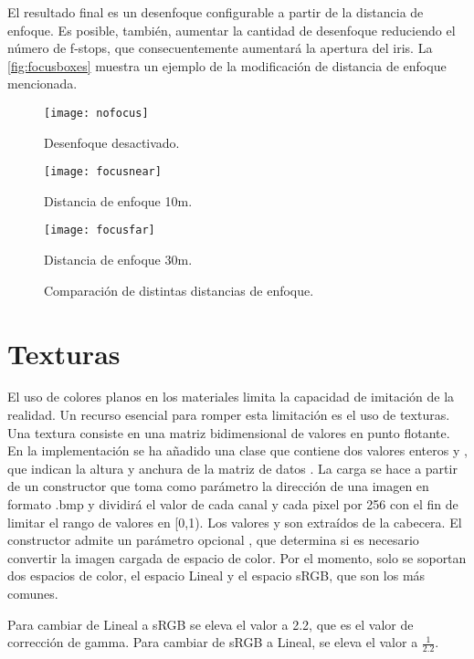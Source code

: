 El resultado final es un desenfoque configurable a partir de la distancia de enfoque. Es posible, también, aumentar la cantidad de desenfoque reduciendo el número de f-stops, que consecuentemente aumentará la apertura del iris. La \autoref{fig:focusboxes} muestra un ejemplo de la modificación de distancia de enfoque mencionada.

\begin{figure}[H]
	\centering
  \begin{minipage}[b]{0.3\textwidth}
	\texttt{[image: nofocus]}
	\caption{Desenfoque desactivado.}
  \end{minipage}
  \hfill
  \begin{minipage}[b]{0.3\textwidth}
	\texttt{[image: focusnear]}
	\caption{Distancia de enfoque 10m.}
  \end{minipage}
  	\hfill
  \begin{minipage}[b]{0.3\textwidth}
	\texttt{[image: focusfar]}
	\caption{Distancia de enfoque 30m.}
  \end{minipage}
\caption{Comparación de distintas distancias de enfoque.}
\label{fig:focusboxes}
\end{figure}
	
		
\section{Texturas}
	
El uso de colores planos en los materiales limita la capacidad de imitación de la realidad. Un recurso esencial para romper esta limitación es el uso de texturas. Una textura consiste en una matriz bidimensional de valores en punto flotante. En la implementación se ha añadido una clase  que contiene dos valores enteros  y , que indican la altura y anchura de la matriz de datos . La carga se hace a partir de un constructor que toma como parámetro la dirección de una imagen en formato .bmp y dividirá el valor de cada canal y cada pixel por 256 con el fin de limitar el rango de valores en [0,1). Los valores  y  son extraídos de la cabecera. El constructor admite un parámetro opcional , que determina si es necesario convertir la imagen cargada de espacio de color. Por el momento, solo se soportan dos espacios de color, el espacio Lineal y el espacio sRGB, que son los más comunes.

Para cambiar de Lineal a sRGB se eleva el valor a 2.2, que es el valor de corrección de gamma. Para cambiar de sRGB a Lineal, se eleva el valor a $\frac{1}{2.2}$.
	
